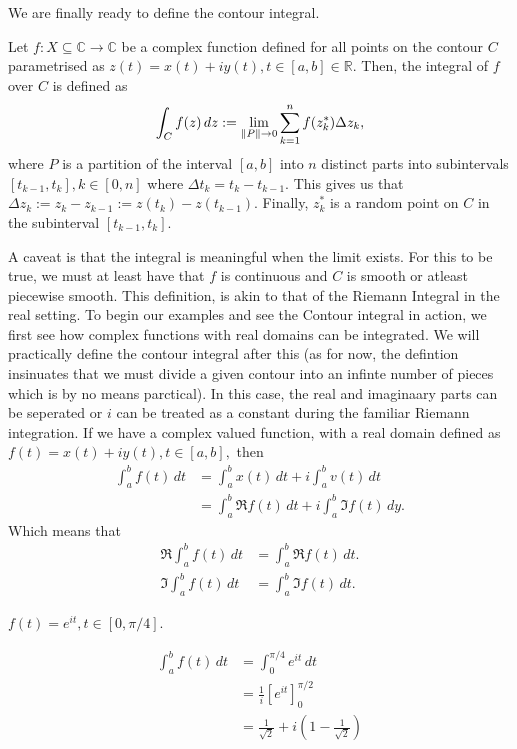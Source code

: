 \documentclass[12pt]{book}
\begin{document}
We are finally ready to define the contour integral. 

\begin{defn}
    Let $f: X \subseteq \mathbb{C} \rightarrow \mathbb{C}$ be a complex function defined for all points on the contour $C$ parametrised as $z(t) = x(t) + iy(t), t \in [a, b] \in \mathbb{R}.$ Then, the integral of $f$ over $C$ is defined as
    \[
        \int_{C} f(z)\,dz := \lim_{\left\lVert P \right\rVert \rightarrow 0} \sum_{k = 1}^{n}f(z^{*}_{k})\Delta z_{k},
    \]
    where $P$ is a partition of the interval $[a, b]$ into $n$ distinct parts into subintervals $[t_{k - 1}, t_{k}], k \in [0, n]$ where $\Delta t_{k} = t_{k} - t_{k - 1}.$ This gives us that $\Delta z_{k} := z_{k} - z_{k - 1} := z(t_{k}) - z(t_{k - 1}).$ Finally, $z^{*}_{k}$ is a random point on $C$ in the subinterval $[t_{k - 1}, t_{k}].$
\end{defn}
A caveat is that the integral is meaningful when the limit exists. For this to be true, we must at least have that $f$ is continuous and $C$ is smooth or atleast piecewise smooth. This definition, is akin to that of the Riemann Integral in the real setting. To begin our examples and see the Contour integral in action, we first see how complex functions with real domains can be integrated. We will practically define the contour integral after this (as for  now, the defintion insinuates that we must divide a given contour into an infinte number of pieces which is by no means parctical). In this case, the real and imaginaary parts can be seperated or $i$ can be treated as a constant during the familiar Riemann integration. If we have a complex valued function, with a real domain defined as $f(t) = x(t) + iy(t), t \in [a, b],$ then
\begin{align*}
    \int_{a}^{b} f(t)\,dt
        &=
            \int_{a}^{b} x(t)\,dt + i\int_{a}^{b} v(t)\,dt \\
        &=
            \int_{a}^{b} \Re f(t)\,dt + i\int_{a}^{b} \Im f(t)\,dy.
\end{align*}
Which means that 
\begin{align*}
    \Re \int_{a}^{b} f(t)\,dt
        &= 
            \int_{a}^{b} \Re f(t)\,dt. \\
    \Im \int_{a}^{b} f(t)\,dt
        &= 
            \int_{a}^{b} \Im f(t)\,dt.
\end{align*}

\begin{exmp}
    $f(t) = e^{it}, t \in [0, \pi / 4].$
\end{exmp}
\begin{align*}
    \int_{a}^{b} f(t)\,dt
        &=
            \int_{0}^{\pi / 4} e^{it}\,dt \\
        &=
            \frac{1}{i}
            \left[
                e^{it}
            \right]_{0}^{\pi / 2} \\
        &=
            \frac{1}{\sqrt{2}} + i\left(1 - \frac{1}{\sqrt{2}}\right)
\end{align*}
\end{document}
